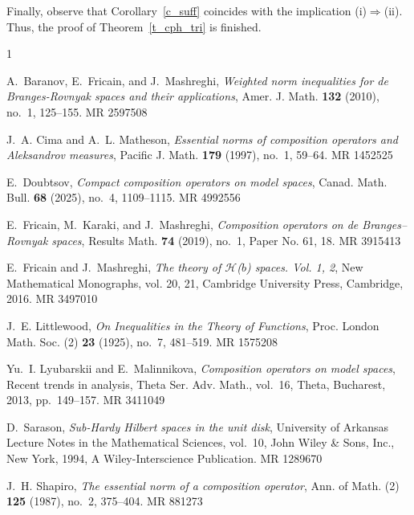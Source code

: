 \documentclass{amsart}
\numberwithin{equation}{section}
\theoremstyle{definition}
\begin{document}
Finally, observe that Corollary~\ref{c_suff} coincides with the implication (i)$\Rightarrow$(ii).
Thus, the proof of Theorem~\ref{t_cph_tri} is finished.



%
\providecommand{\bysame}{\leavevmode\hbox to3em{\hrulefill}\thinspace}
\providecommand{\MR}{\relax\ifhmode\unskip\space\fi MR }
\providecommand{\MRhref}[2]{%
  \href{http://www.ams.org/mathscinet-getitem?mr=#1}{#2}
}
\providecommand{\href}[2]{#2}
\begin{thebibliography}{1}

A.~Baranov, E.~Fricain, and J.~Mashreghi, \emph{Weighted norm inequalities for
  de {B}ranges-{R}ovnyak spaces and their applications}, Amer. J. Math.
  \textbf{132} (2010), no.~1, 125--155. \MR{2597508}

J.~A. Cima and A.~L. Matheson, \emph{Essential norms of composition operators
  and {A}leksandrov measures}, Pacific J. Math. \textbf{179} (1997), no.~1,
  59--64. \MR{1452525}

E.~Doubtsov, \emph{Compact composition operators on model spaces}, Canad. Math.
  Bull. \textbf{68} (2025), no.~4, 1109--1115. \MR{4992556}

E.~Fricain, M.~Karaki, and J.~Mashreghi, \emph{Composition operators on de
  {B}ranges--{R}ovnyak spaces}, Results Math. \textbf{74} (2019), no.~1, Paper
  No. 61, 18. \MR{3915413}

E.~Fricain and J.~Mashreghi, \emph{The theory of {$\mathcal H$}({$b$}) spaces.
  {V}ol. 1, 2}, New Mathematical Monographs, vol. 20, 21, Cambridge University
  Press, Cambridge, 2016. \MR{3497010}

J.~E. Littlewood, \emph{On {I}nequalities in the {T}heory of {F}unctions},
  Proc. London Math. Soc. (2) \textbf{23} (1925), no.~7, 481--519. \MR{1575208}

Yu.~I. Lyubarskii and E.~Malinnikova, \emph{Composition operators on model
  spaces}, Recent trends in analysis, Theta Ser. Adv. Math., vol.~16, Theta,
  Bucharest, 2013, pp.~149--157. \MR{3411049}

D.~Sarason, \emph{Sub-{H}ardy {H}ilbert spaces in the unit disk}, University of
  Arkansas Lecture Notes in the Mathematical Sciences, vol.~10, John Wiley \&
  Sons, Inc., New York, 1994, A Wiley-Interscience Publication. \MR{1289670}

J.~H. Shapiro, \emph{The essential norm of a composition operator}, Ann. of
  Math. (2) \textbf{125} (1987), no.~2, 375--404. \MR{881273}

\end{thebibliography}
\end{document}
